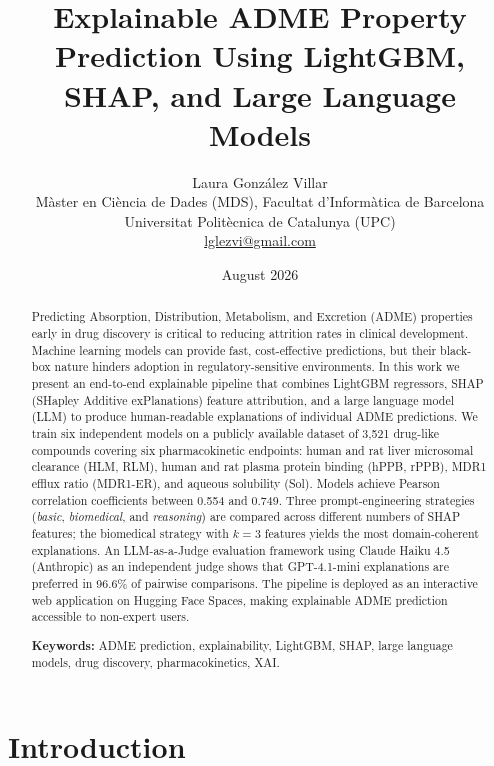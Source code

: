 \documentclass[a4paper, 11pt]{article}
\title{%
  \textbf{Explainable ADME Property Prediction Using LightGBM,\\
  SHAP, and Large Language Models}
  \vspace{0.3em}
}
\author{%
  Laura González Villar\\
  \small Màster en Ciència de Dades (MDS), Facultat d'Informàtica de Barcelona\\
  \small Universitat Politècnica de Catalunya (UPC)\\
  \small \href{mailto:lglezvi@gmail.com}{lglezvi@gmail.com}
  \and
}
\date{August 2026}
\begin{document}
\maketitle
\thispagestyle{empty}

\begin{abstract}
Predicting Absorption, Distribution, Metabolism, and Excretion (ADME)
properties early in drug discovery is critical to reducing attrition rates
in clinical development. Machine learning models can provide fast,
cost-effective predictions, but their black-box nature hinders adoption in
regulatory-sensitive environments. In this work we present an end-to-end
explainable pipeline that combines LightGBM regressors, SHAP
(SHapley Additive exPlanations) feature attribution, and a large language
model (LLM) to produce human-readable explanations of individual ADME
predictions. We train six independent models on a publicly available
dataset of 3{,}521 drug-like compounds covering six pharmacokinetic
endpoints: human and rat liver microsomal clearance (HLM, RLM), human and
rat plasma protein binding (hPPB, rPPB), MDR1 efflux ratio (MDR1-ER), and
aqueous solubility (Sol). Models achieve Pearson correlation coefficients
between 0.554 and 0.749. Three prompt-engineering strategies (\textit{basic},
\textit{biomedical}, and \textit{reasoning}) are compared across different
numbers of SHAP features; the biomedical strategy with $k{=}3$ features
yields the most domain-coherent explanations. An LLM-as-a-Judge evaluation
framework using Claude Haiku 4.5 (Anthropic) as an independent judge shows
that GPT-4.1-mini explanations are preferred in 96.6\% of pairwise comparisons. The pipeline is deployed as an interactive web
application on Hugging Face Spaces, making explainable ADME prediction
accessible to non-expert users.

\medskip
\noindent\textbf{Keywords:} ADME prediction, explainability, LightGBM,
SHAP, large language models, drug discovery, pharmacokinetics, XAI.
\end{abstract}

\newpage
\tableofcontents
\newpage


\section{Introduction}
\label{sec:intro}
\end{document}
